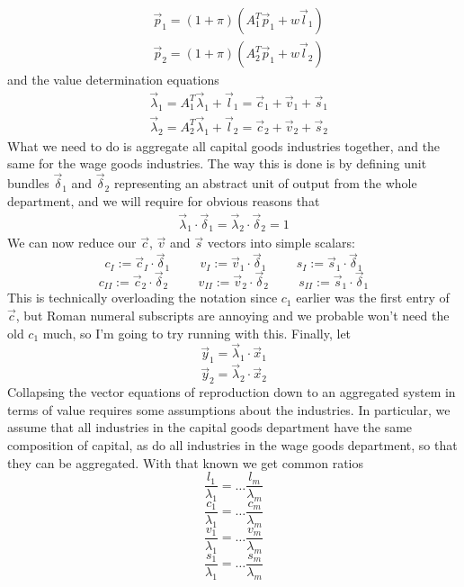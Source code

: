 \documentclass{article}
\theoremstyle{definition}
\theoremstyle{plain}
\theoremstyle{theorem}
\begin{document}
\begin{align}
	& \vec{p}_1 = (1+\pi)(A_1^T\vec{p}_1 + w\vec{l}_1) \\
	& \vec{p}_2 = (1+\pi)(A_2^T\vec{p}_1 + w\vec{l}_2) 
\end{align}
and the value determination equations
\begin{align}
	& \vec{\lambda}_1 = A_1^T\vec{\lambda}_1 + \vec{l}_1 = \vec{c}_1 + \vec{v}_1 + \vec{s}_1 \\
	& \vec{\lambda}_2 = A_2^T\vec{\lambda}_1 + \vec{l}_2 = \vec{c}_2 + \vec{v}_2 + \vec{s}_2
\end{align}
What we need to do is aggregate all capital goods industries together, and the same for the wage goods industries. The way this is done is by defining unit bundles $\vec{\delta}_1$ and $\vec{\delta}_2$ representing an abstract unit of output from the whole department, and we will require for obvious reasons that 
\begin{align}
	\vec{\lambda}_1 \cdot \vec{\delta}_1 = \vec{\lambda}_2 \cdot \vec{\delta}_2 = 1 
\end{align}
We can now reduce our $\vec{c}$, $\vec{v}$ and $\vec{s}$ vectors into simple scalars:
\[ c_I := \vec{c}_I \cdot \vec{\delta}_1 \hspace{1cm} v_I := \vec{v}_1 \cdot \vec{\delta}_1 \hspace{1cm} s_I := \vec{s}_1 \cdot \vec{\delta}_1 \]
\[ c_{II} := \vec{c}_2 \cdot \vec{\delta}_2 \hspace{1cm} v_{II} := \vec{v}_2 \cdot \vec{\delta}_2 \hspace{1cm} s_{II} := \vec{s}_1 \cdot \vec{\delta}_1 \]
This is technically overloading the notation since $c_1$ earlier was the first entry of $\vec{c}$, but Roman numeral subscripts are annoying and we probable won't need the old $c_1$ much, so I'm going to try running with this. Finally, let 
\[ \vec{y}_1 = \vec{\lambda}_1 \cdot \vec{x}_1 \]
\[ \vec{y}_2 = \vec{\lambda}_2 \cdot \vec{x}_2 \]
Collapsing the vector equations of reproduction down to an aggregated system in terms of value requires some assumptions about the industries. In particular, we assume that all industries in the capital goods department have the same composition of capital, as do all industries in the wage goods department, so that they can be aggregated. With that known we get common ratios 
\[ \frac{l_1}{\lambda_1} = \ldots \frac{l_m}{\lambda_m} \]
\[ \frac{c_1}{\lambda_1} = \ldots \frac{c_m}{\lambda_m} \]
\[ \frac{v_1}{\lambda_1} = \ldots \frac{v_m}{\lambda_m} \]
\[ \frac{s_1}{\lambda_1} = \ldots \frac{s_m}{\lambda_m} \]
\end{document}
